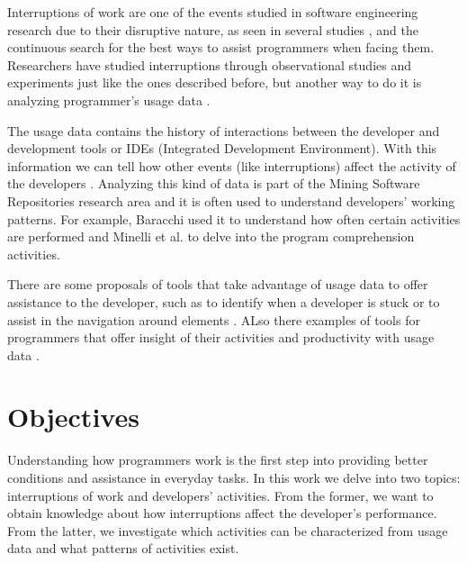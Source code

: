 Interruptions of work are one of the events studied in software engineering research due to their disruptive nature, as seen in several studies \cite{BKC01, BL96, CDT07, AT04}, and the continuous search for the best ways to assist programmers when facing them. Researchers have studied interruptions through observational studies \cite{IH07, LVD06} and experiments \cite{CDT07} just like the ones described before, but another way to do it is analyzing programmer's usage data \cite{SRV15}.

The usage data contains the history of interactions between the developer and development tools or IDEs (Integrated Development Environment). With this information we can tell how other events (like interruptions) affect the activity of the developers \cite{SnipesETALASD}. Analyzing this kind of data is part of the Mining Software Repositories research area \cite{H04} and it is often used to understand developers' working patterns. For example, Baracchi \cite{B14} used it to understand how often certain activities are performed and Minelli et al. \cite{MMLK14} to delve into the program comprehension activities.

\begin{changedforreviewerlong}

There are some proposals of tools that take advantage of usage data to offer assistance to the developer, such as to identify when a developer is stuck \cite{CD10} or to assist in the navigation around elements \cite{KM06}. ALso there examples of tools for programmers that offer insight of their activities and productivity with usage data \cite{CLQ15}.

\end{changedforreviewerlong}




\section{Objectives}
\begin{changedforreviewerlong}
Understanding how programmers work is the first step into providing better conditions and assistance in everyday tasks. In this work we delve into two topics: interruptions of work and developers' activities. From the former, we want to obtain knowledge about how interruptions affect the developer's performance. From the latter, we investigate which activities can be characterized from usage data and what patterns of activities exist.
\end{changedforreviewerlong}
 
